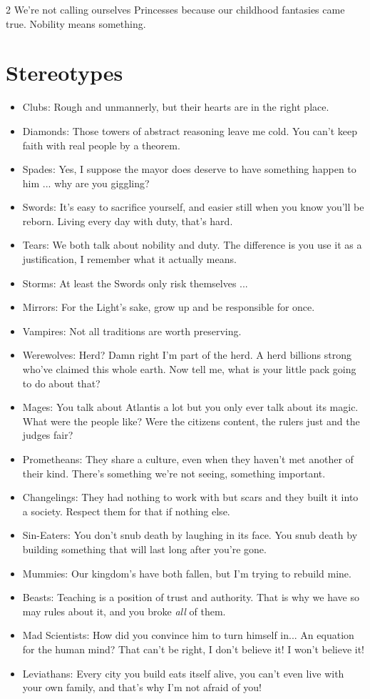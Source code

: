 \begin{multicols}{2}
We're not calling ourselves Princesses because our childhood fantasies came true. Nobility means something. 

\section*{Stereotypes}

\begin{itemize}
\item Clubs: Rough and unmannerly, but their hearts are in the right place.
\item Diamonds: Those towers of abstract reasoning leave me cold. You can't keep faith with real people by a theorem.
\item Spades: Yes, I suppose the mayor does deserve to have something happen to him ... why are you giggling?
\item Swords: It's easy to sacrifice yourself, and easier still when you know you'll be reborn. Living every day with duty, that's hard.
\item Tears: We both talk about nobility and duty. The difference is you use it as a justification, I remember what it actually means. 
\item Storms: At least the Swords only risk themselves ...
\item Mirrors: For the Light's sake, grow up and be responsible for once.

\item Vampires: Not all traditions are worth preserving.
\item Werewolves: Herd? Damn right I'm part of the herd. A herd billions strong who've claimed this whole earth. Now tell me, what is your little pack going to do about that?
\item Mages: You talk about Atlantis a lot but you only ever talk about its magic. What were the people like? Were the citizens content, the rulers just and the judges fair?
\item Prometheans: They share a culture, even when they haven't met another of their kind. There's something we're not seeing, something important.
\item Changelings: They had nothing to work with but scars and they built it into a society. Respect them for that if nothing else.
\item Sin-Eaters: You don't snub death by laughing in its face. You snub death by building something that will last long after you're gone.
\item Mummies: Our kingdom's have both fallen, but I'm trying to rebuild mine. 
\item Beasts: Teaching is a position of trust and authority. That is why we have so may rules about it, and you broke \textit{all} of them.
\item Mad Scientists: How did you convince him to turn himself in... An equation for the human mind? That can't be right, I don't believe it! I won't believe it!
\item Leviathans: Every city you build eats itself alive, you can't even live with your own family, and that's why I'm not afraid of you!


\end{itemize}
\end{multicols}
